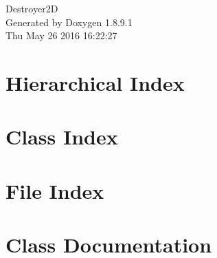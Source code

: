 \documentclass[twoside]{book}
\newcommand{\+}{\discretionary{\mbox{\scriptsize$\hookleftarrow$}}{}{}}
\newcommand{\clearemptydoublepage}{%
  \newpage{\pagestyle{empty}\cleardoublepage}%
}
\begin{document}
\hypersetup{pageanchor=false,
             bookmarks=true,
             bookmarksnumbered=true,
             pdfencoding=unicode
            }
\begin{titlepage}
\vspace*{7cm}
\begin{center}%
{\Large Destroyer2\+D }\\
\vspace*{1cm}
{\large Generated by Doxygen 1.8.9.1}\\
\vspace*{0.5cm}
{\small Thu May 26 2016 16:22:27}\\
\end{center}
\end{titlepage}
\clearemptydoublepage
\tableofcontents
\clearemptydoublepage
{}
\hypersetup{pageanchor=true}

\chapter{Hierarchical Index}

\chapter{Class Index}

\chapter{File Index}

\chapter{Class Documentation}






































\end{document}
